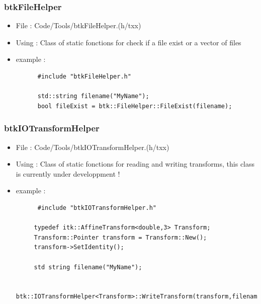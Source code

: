    \subsubsection{btkFileHelper}
    \begin{itemize}
    \item File : Code/Tools/btkFileHelper.(h/txx)
    \item Using : Class of static fonctions for check if a file exist or a vector of files
    \item example :
      \begin{verbatim}
      #include "btkFileHelper.h"

      std::string filename("MyName");
      bool fileExist = btk::FileHelper::FileExist(filename);
      \end{verbatim}

    \end{itemize}

    \subsubsection{btkIOTransformHelper}
    \begin{itemize}
    \item File : Code/Tools/btkIOTransformHelper.(h/txx)
    \item Using : Class of static fonctions for reading and writing transforms, this class is currently under developpment !
    \item example :
      \begin{verbatim}
      #include "btkIOTransformHelper.h"

     typedef itk::AffineTransform<double,3> Transform;
     Transform::Pointer transform = Transform::New();
     transform->SetIdentity();

     std string filename("MyName");

     btk::IOTransformHelper<Transform>::WriteTransform(transform,filename);
      
      \end{verbatim}

    \end{itemize}

